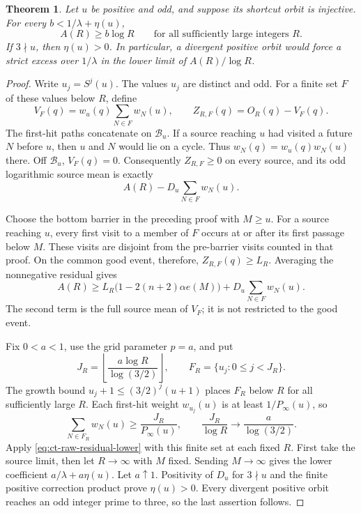 \documentclass[11pt,a4paper]{article}
\newtheorem{theorem}{Theorem}
\begin{document}
\begin{theorem}\label{thm:ct-raw-divergent-excess}
Let \(u\) be positive and odd, and suppose its shortcut orbit is
injective. For every \(b<1/\lambda+\eta(u)\),
\[
 A(R)\ge b\log R
 \qquad\text{for all sufficiently large integers }R.
\]
If \(3\nmid u\), then \(\eta(u)>0\). In particular, a divergent
positive orbit would force a strict excess over \(1/\lambda\) in
the lower limit of \(A(R)/\log R\).
\end{theorem}
\begin{proof}
Write \(u_j=S^j(u)\). The values \(u_j\) are distinct and odd.
For a finite set \(F\) of these values below \(R\), define
\[
 V_F(q)=w_u(q)\sum_{N\in F}w_N(u),\qquad
 Z_{R,F}(q)=O_R(q)-V_F(q).
\]
The first-hit paths concatenate on \(\mathcal B_u\). If a source
reaching \(u\) had visited a future \(N\) before \(u\), then
\(u\) and \(N\) would lie on a cycle. Thus
\(w_N(q)=w_u(q)w_N(u)\) there. Off \(\mathcal B_u\),
\(V_F(q)=0\). Consequently \(Z_{R,F}\ge0\) on every source,
and its odd logarithmic source mean is exactly
\[
 A(R)-D_u\sum_{N\in F}w_N(u).
\]

Choose the bottom barrier in the preceding proof with \(M\ge u\).
For a source reaching \(u\), every first visit to a member of \(F\)
occurs at or after its first passage below \(M\). These visits are disjoint
from the pre-barrier visits counted in that proof. On the common good
event, therefore, \(Z_{R,F}(q)\ge L_R\). Averaging the nonnegative
residual gives
\begin{equation}\label{eq:ct-raw-residual-lower}
 A(R)\ge L_R\bigl(1-2(n+2)\alpha e(M)\bigr)
              +D_u\sum_{N\in F}w_N(u).
\end{equation}
The second term is the full source mean of \(V_F\); it is not
restricted to the good event.

Fix \(0<a<1\), use the grid parameter \(p=a\), and put
\[
 J_R=\left\lfloor\frac{a\log R}{\log(3/2)}\right\rfloor,
 \qquad F_R=\{u_j:0\le j<J_R\}.
\]
The growth bound \(u_j+1\le(3/2)^j(u+1)\) places \(F_R\)
below \(R\) for all sufficiently large \(R\). Each first-hit
weight \(w_{u_j}(u)\) is at least \(1/P_\infty(u)\), so
\[
 \sum_{N\in F_R}w_N(u)\ge\frac{J_R}{P_\infty(u)},
 \qquad \frac{J_R}{\log R}\longrightarrow\frac a{\log(3/2)}.
\]
Apply \eqref{eq:ct-raw-residual-lower} with this finite set at each
fixed \(R\). First take the source limit, then let \(R\to\infty\)
with \(M\) fixed. Sending \(M\to\infty\) gives the lower
coefficient \(a/\lambda+a\eta(u)\). Let \(a\uparrow1\).
Positivity of \(D_u\) for \(3\nmid u\) and the finite positive
correction product prove \(\eta(u)>0\). Every divergent positive
orbit reaches an odd integer prime to three, so the last assertion
follows.
\end{proof}
\end{document}
